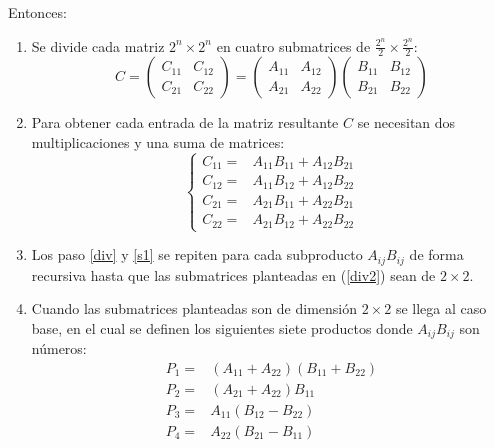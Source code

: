 \documentclass[12pt,letterpaper]{article}
\begin{document}
Entonces:
\begin{enumerate}

\item \label{div} Se divide cada matriz $2^n\times 2^n$ en cuatro submatrices de $\frac{2^n}{2}\times\frac{2^n}{2}$:\\
\begin{equation}
C=
\left(
\begin{array}{cc}
	C_{11} & C_{12}\\
    C_{21} & C_{22}
\end{array}
\right)
=
\left(
\begin{array}{cc}
	A_{11} & A_{12}\\
    A_{21} & A_{22}
\end{array}
\right)
\left(
\begin{array}{cc}
	B_{11} & B_{12}\\
	B_{21} & B_{22}
\end{array}
 \right)
 \label{div2}
\end{equation}
\item \label{sist} Para obtener cada entrada de la matriz resultante $C$ se necesitan dos multiplicaciones y una suma de matrices: 
\begin{equation}
	\begin{cases}
		C_{11}= &  A_{11}B_{11}+A_{12}B_{21} \\
		C_{12}= &  A_{11}B_{12}+A_{12}B_{22} \\
		C_{21}= &  A_{21}B_{11}+A_{22}B_{21} \\
        C_{22}= &  A_{21}B_{12}+A_{22}B_{22}
	\end{cases}
\label{s1}
\end{equation}
\item Los paso \ref{div} y \ref{s1} se repiten para cada subproducto $A_{ij}B_{ij}$ de forma recursiva hasta que las submatrices planteadas en (\ref{div2}) sean de $2\times2$.
\item Cuando las submatrices planteadas son de dimensión $2\times2$ se llega al caso base, en el cual se definen los siguientes siete productos donde $A_{ij}B_{ij}$ son números:
\begin{equation}
	\begin{split}
		P_{1}= & (A_{11}+A_{22})(B_{11}+B_{22})\\
		P_{2}= & (A_{21}+A_{22})B_{11} \\
		P_{3}= &  A_{11}(B_{12}-B_{22}) \\
        P_{4}= &  A_{22}(B_{21}-B_{11}) \\

\end{split}
\end{equation}
\end{enumerate}
\end{document}
